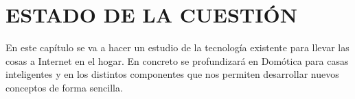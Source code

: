 \chapter{ESTADO DE LA CUESTIÓN}

En este capítulo se va a hacer un estudio de la tecnología existente para llevar las cosas a Internet en el hogar. En concreto se profundizará en Domótica para casas inteligentes y en los distintos componentes que nos permiten desarrollar nuevos conceptos de forma sencilla.





